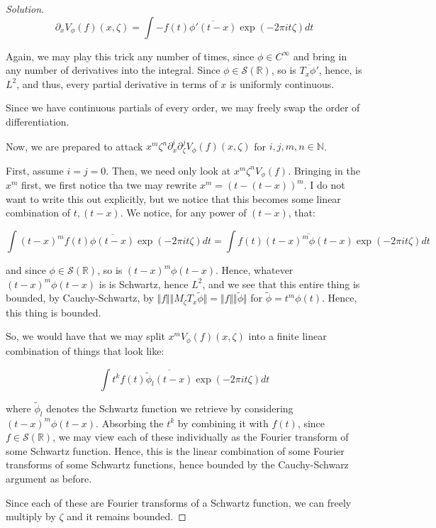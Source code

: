 \documentclass[10pt]{article}
\begin{document}
\begin{proof}[Solution]
$$\partial_x V_\phi(f)(x, \zeta) = \int -f(t) \overline{\phi'(t - x)} \exp(-2\pi i t \zeta) dt $$

Again, we may play this trick any number of times, since $\phi \in C^\infty$ and bring in any number of derivatives into the integral. Since $\phi \in \mathcal{S}(\mathbb{R})$, so is $\overline{T_x \phi'}$, hence, is $L^2$, and thus, every partial derivative in terms of $x$ is uniformly continuous.

Since we have continuous partials of every order, we may freely swap the order of differentiation.

Now, we are prepared to attack $x^m \zeta^n \partial_x^i \partial_\zeta^j V_\phi(f)(x, \zeta)$ for $i, j, m, n \in \mathbb{N}$.

First, assume $i = j = 0$. Then, we need only look at $x^m \zeta^n V_\phi(f)$. Bringing in the $x^m$ first, we first notice tha twe may rewrite $x^m = (t - (t-x))^m$. I do not want to write this out explicitly, but we notice that this becomes some linear combination of $t, (t-x)$. We notice, for any power of $(t-x)$, that:

$$ \int (t-x)^m f(t) \overline{\phi(t - x)} \exp(-2\pi i t \zeta) dt  = \int f(t) \overline{(t-x)^m\phi(t-x)} \exp(-2\pi i t \zeta) dt $$

and since $\phi \in \mathcal{S}(\mathbb{R})$, so is $(t-x)^m \phi(t-x)$. Hence, whatever $(t- x)^m \phi(t-x)$ is is Schwartz, hence $L^2$, and we see that this entire thing is bounded, by Cauchy-Schwartz, by $\Vert f \Vert \Vert M_\zeta T_x \tilde{\phi} \Vert  = \Vert f \Vert \Vert \tilde{\phi} \Vert$ for $\tilde{\phi} = t^m \phi(t)$. Hence, this thing is bounded. 

So, we would have that we may split $ x^m V_\phi(f)(x, \zeta)$ into a finite linear combination of things that look like:

$$ \int t^k f(t) \overline{ \tilde{\phi}_l(t - x)} \exp(-2 \pi i t \zeta) dt $$

where $\tilde{\phi}_l$ denotes the Schwartz function we retrieve by considering $(t-x)^m \phi(t-x)$. Absorbing the $t^k$ by combining it with $f(t)$, since $f \in \mathcal{S}(\mathbb{R})$, we may view each of these individually as the Fourier transform of some Schwartz function. Hence, this is the linear combination of some Fourier transforms of some Schwartz functions, hence bounded  by the Cauchy-Schwarz argument as before.

Since each of these are Fourier transforms of a Schwartz function, we can freely multiply by $\zeta$ and it remains bounded.


\end{proof}
\end{document}
